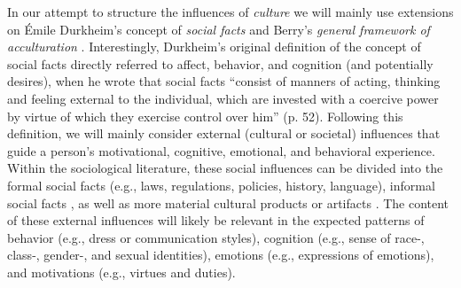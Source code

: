 \documentclass[man, 12pt, a4paper]{apa7}
\begin{document}
In our attempt to structure the influences of \textit{culture} we will mainly use extensions on Émile Durkheim's concept of \textit{social facts} \citep[e.g.,][]{Durkheim1982, Gilbert1989} and Berry's \textit{general framework of acculturation} \citep{Berry1997b, Berry2003, Berry2006a}. Interestingly, Durkheim's original definition of the concept of social facts directly referred to affect, behavior, and cognition (and potentially desires), when he wrote that social facts ``consist of manners of acting, thinking and feeling external to the individual, which are invested with a coercive power by virtue of which they exercise control over him'' (p. 52). Following this definition, we will mainly consider external (cultural or societal) influences that guide a person's motivational, cognitive, emotional, and behavioral experience. Within the sociological literature, these social influences can be divided into the formal social facts (e.g., laws, regulations, policies, history, language), informal social facts \citep[e.g., norms, values, beliefs, rituals, customs; also see][]{Herzog2018}, as well as more material cultural products or artifacts \citep[e.g., food, fashion, architecture, or arts, such as film, music, literature, and fine arts; e.g., see][]{Alexander2001}. The content of these external influences will likely be relevant in the expected patterns of behavior (e.g., dress or communication styles), cognition (e.g., sense of race-, class-, gender-, and sexual identities), emotions (e.g., expressions of emotions), and motivations (e.g., virtues and duties).
\end{document}
